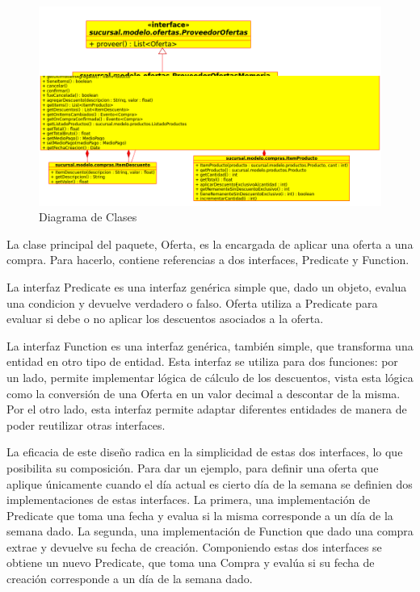 \documentclass[a4paper,11pt]{article}
\begin{document}
\begin{figure}[!htp]
\begin{center}
\includegraphics[width=1\textwidth]{src/docs/ofertas.png}
\end{center}
\caption{Diagrama de Clases} \label{fig:oferta}
\end{figure}

\FloatBarrier

La clase principal del paquete, Oferta, es la encargada de aplicar una oferta a
una compra. Para hacerlo, contiene referencias a dos interfaces, Predicate y
Function.

La interfaz Predicate es una interfaz genérica simple que, dado un objeto,
evalua una condicion y devuelve verdadero o falso. Oferta utiliza a Predicate
para evaluar si debe o no aplicar los descuentos asociados a la oferta.

La interfaz Function es una interfaz genérica, también simple, que transforma
una entidad en otro tipo de entidad. Esta interfaz se utiliza para dos
funciones: por un lado, permite implementar lógica de cálculo de los
descuentos, vista esta lógica como la conversión de una Oferta en un valor
decimal a descontar de la misma. Por el otro lado, esta interfaz permite
adaptar diferentes entidades de manera de poder reutilizar otras interfaces.

La eficacia de este diseño radica en la simplicidad de estas dos interfaces, lo
que posibilita su composición. Para dar un ejemplo, para definir una oferta que
aplique únicamente cuando el día actual es cierto día de la semana se definien
dos implementaciones de estas interfaces. La primera, una implementación de
Predicate que toma una fecha y evalua si la misma corresponde a un día de la
semana dado. La segunda, una implementación de Function que dado una compra
extrae y devuelve su fecha de creación. Componiendo estas dos interfaces se
obtiene un nuevo Predicate, que toma una Compra y evalúa si su fecha de
creación corresponde a un día de la semana dado.
\end{document}
